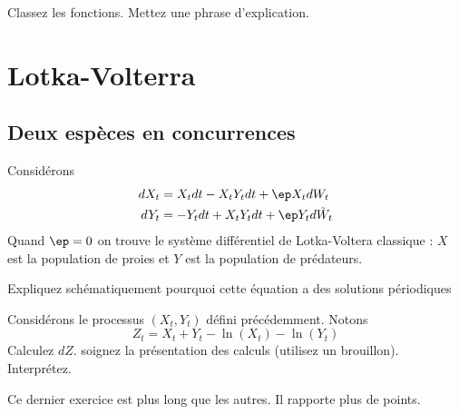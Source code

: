 \documentclass{article}
\begin{document}
Classez les fonctions. Mettez une phrase d'explication. 

\begin{grostro}

\vspace{3cm}


\end{grostro}







\section{Lotka-Volterra}


\subsection{Deux espèces en concurrences}

\begin{exemple} Considérons 
\begin{alignat*}{1}
dX_t &= X_t dt  - X_t Y_tdt  + \ep X_t dW_t\\
dY_t &= -Y_t dt  + X_t Y_tdt  + \ep Y_t d\tilde W_t
\end{alignat*}
Quand $\ep=0$ on trouve le système différentiel de Lotka-Voltera classique :  $X$ est la population de proies et $Y$ est la population de prédateurs.
\end{exemple}

Expliquez schématiquement pourquoi cette équation a des solutions périodiques

\begin{grostro}

\vspace{3cm}

\end{grostro}




\begin{exo}  Considérons le processus $(X_t,Y_t)$ défini précédemment. Notons 
$$
Z_t= X_t+Y_t - \ln(X_t) - \ln(Y_t)
$$
Calculez $dZ$. soignez la présentation des calculs (utilisez un brouillon). Interprétez. 
\end{exo}

Ce dernier exercice est plus long que les autres. Il rapporte plus de points. 



 
\end{document}
